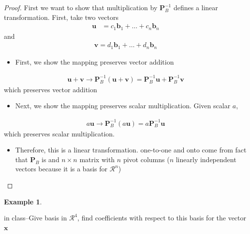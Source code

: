 \documentclass[
]{book}
\providecommand{\tightlist}{%
  \setlength{\itemsep}{0pt}\setlength{\parskip}{0pt}}
\theoremstyle{definition}
\theoremstyle{definition}
\newtheorem{example}{Example}[chapter]
\theoremstyle{definition}
\theoremstyle{remark}
\begin{document}
\begin{proof}

First we want to show that multiplication by \(\mathbf{P}_B^{-1}\) defines a linear transformation. First, take two vectors
\[
\begin{aligned}
\mathbf{u} &  = c_1 \mathbf{b}_1 + \ldots + c_n \mathbf{b}_n
\end{aligned}
\]
and
\[
\begin{aligned}
\mathbf{v} = d_1 \mathbf{b}_1 + \ldots + d_n \mathbf{b}_n
\end{aligned}
\]

\begin{itemize}
\tightlist
\item
  First, we show the mapping preserves vector addition
\end{itemize}

\[
\begin{aligned}
\mathbf{u} + \mathbf{v} \rightarrow \mathbf{P}_B^{-1} (\mathbf{u} + \mathbf{v}) =  \mathbf{P}_B^{-1} \mathbf{u} + \mathbf{P}_B^{-1} \mathbf{v}
\end{aligned}
\]
which preserves vector addition

\begin{itemize}
\tightlist
\item
  Next, we show the mapping preserves scalar multiplication. Given scalar \(a\),
\end{itemize}

\[
\begin{aligned}
a\mathbf{u} \rightarrow \mathbf{P}_B^{-1} (a \mathbf{u}) =  a \mathbf{P}_B^{-1} \mathbf{u}
\end{aligned}
\]
which preserves scalar multiplication.

\begin{itemize}
\tightlist
\item
  Therefore, this is a linear transformation. one-to-one and onto come from fact that \(\mathbf{P}_B\) is and \(n \times n\) matrix with \(n\) pivot columns (\(n\) linearly independent vectors because it is a basis for \(\mathcal{R}^n\))
\end{itemize}

\end{proof}

\begin{example}
\protect\hypertarget{exm:unlabeled-div-141}{}\label{exm:unlabeled-div-141}

in class--Give basis in \(\mathcal{R}^4\), find coefficients with respect to this basis for the vector \(\mathbf{x}\)

\end{example}
\end{document}
